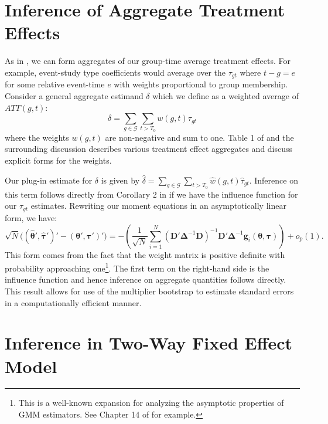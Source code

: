\section{Inference of Aggregate Treatment Effects}

As in \citet{Callaway_Santanna_2021}, we can form aggregates of our group-time average treatment effects. For example, event-study type coefficients would average over the $\tau_{gt}$ where $t - g = e$ for some relative event-time $e$ with weights proportional to group membership. Consider a general aggregate estimand $\delta$ which we define as a weighted average of $ATT(g,t)$:
\begin{equation}
\delta = \sum_{g\in \mathcal{G}} \sum_{t > T_0} w(g,t) \tau_{gt}
\end{equation}
where the weights $w(g,t)$ are non-negative and sum to one. Table 1 of \citet{Callaway_Santanna_2021} and the surrounding discussion describes various treatment effect aggregates and discuss explicit forms for the weights. 

Our plug-in estimate for $\delta$ is given by $\hat{\delta} = \sum_{g\in \mathcal{G}} \sum_{t > T_0} \hat{w}(g,t) \hat{\tau}_{gt}$. Inference on this term follows directly from Corollary 2 in \citet{Callaway_Santanna_2021} if we have the influence function for our $\tau_{gt}$ estimates. Rewriting our moment equations in an asymptotically linear form, we have:
\begin{equation}
    \sqrt{N}\Big( (\widehat{\bm{\theta}}', \widehat{\bm \tau}')' - (\bm{\theta}', \bm \tau')' \Big) = - \left( \frac{1}{\sqrt{N}} \sum_{i = 1}^N (\bm D' \bm \Delta^{-1} \bm D)^{-1} \bm D' \bm \Delta^{-1} \bm g_i(\bm{\theta}, \bm \tau) \right) + o_p(1).
\end{equation}
This form comes from the fact that the weight matrix is positive definite with probability approaching one\footnote{This is a well-known expansion for analyzing the asymptotic properties of GMM estimators. See Chapter 14 of \citet{Wooldridge_2010} for example.}. The first term on the right-hand side is the influence function and hence inference on aggregate quantities follows directly. This result allows for use of the multiplier bootstrap to estimate standard errors in a computationally efficient manner.

\section{Inference in Two-Way Fixed Effect Model}\label{sec:twfe_inference}

